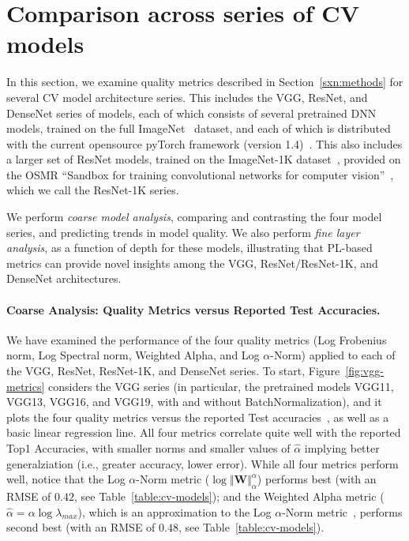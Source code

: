 \section{Comparison across series of CV models}
\label{sxn:cv}

In this section, we examine quality metrics described in Section~\ref{sxn:methods} for several CV model architecture series.
This includes the VGG, ResNet, and DenseNet series of models, each of which consists of several pretrained DNN models, trained on the full ImageNet~\cite{imagenet} dataset, and each of which is distributed with the current opensource pyTorch framework (version 1.4)~\cite{pyTorch}.
This also includes a larger set of ResNet models, trained on the ImageNet-1K dataset~\cite{imagenet1k}, provided on the OSMR ``Sandbox for training convolutional networks for computer vision''~\cite{osmr}, which we call the ResNet-1K series.

We perform \emph{coarse model analysis}, comparing and contrasting the four model series, and predicting trends in model quality. 
We also perform \emph{fine layer analysis}, as a function of depth for these models, illustrating that PL-based metrics can provide novel insights among the VGG, ResNet/ResNet-1K, and DenseNet architectures. 

\paragraph{Coarse Analysis: Quality Metrics versus Reported Test Accuracies.}

We have examined the performance of the four quality metrics (Log Frobenius norm, Log Spectral norm, Weighted Alpha, and Log $\alpha$-Norm) applied to each of the VGG, ResNet, ResNet-1K, and DenseNet series.
To start, Figure~\ref{fig:vgg-metrics} considers the VGG series (in particular, the pretrained models VGG11, VGG13, VGG16, and VGG19, with and without BatchNormalization), and it plots the four quality metrics versus the reported Test accuracies~\cite{pyTorchVgg}, as well as a basic linear regression line. 
All four metrics correlate quite well with the reported Top1 Accuracies, with smaller norms and smaller values of $\hat{\alpha}$ implying better generalziation (i.e., greater accuracy, lower error). 
While all four metrics perform well, notice that the Log $\alpha$-Norm metric ($\log\Vert\mathbf{W}\Vert_{\alpha}^{\alpha}$) performs best (with an RMSE of $0.42$, see Table~\ref{table:cv-models}); and the Weighted Alpha metric ($\hat\alpha =\alpha\log\lambda_{max} $), which is an approximation to the Log $\alpha$-Norm metric~\cite{MM20_unpub_work}, performs second best (with an RMSE of $0.48$, see Table~\ref{table:cv-models}).

